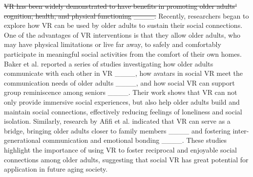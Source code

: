 \sout{VR has been widely demonstrated to have benefits in promoting older adults' cognition, health, and physical functioning ____.}
Recently, researchers began to explore how VR can be used by older adults to sustain their social connections.
One of the advantages of VR interventions is that they allow older adults, who may have physical limitations or live far away, to safely and comfortably participate in meaningful social activities from the comfort of their own homes. Baker et al. reported a series of studies investigating how older adults communicate with each other in VR ____, how avatars in social VR meet the communication needs of older adults ____, and how social VR can support group reminiscence among seniors ____. Their work shows that VR can not only provide immersive social experiences, but also help older adults build and maintain social connections, effectively reducing feelings of loneliness and social isolation. Similarly, research by Afifi et al. indicated that VR can serve as a bridge, bringing older adults closer to family members ____ and fostering inter-generational communication and emotional bonding ____. These studies highlight the importance of using VR to foster reciprocal and enjoyable social connections among older adults, suggesting that social VR has great potential for application in future aging society.

